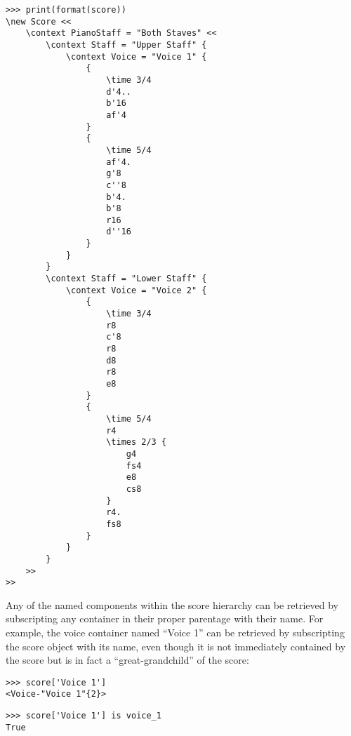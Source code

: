 \begin{abjadbookoutput}
\begin{singlespacing}
\vspace{-0.5\baselineskip}
\begin{lstlisting}
>>> print(format(score))
\new Score <<
    \context PianoStaff = "Both Staves" <<
        \context Staff = "Upper Staff" {
            \context Voice = "Voice 1" {
                {
                    \time 3/4
                    d'4..
                    b'16
                    af'4
                }
                {
                    \time 5/4
                    af'4.
                    g'8
                    c''8
                    b'4.
                    b'8
                    r16
                    d''16
                }
            }
        }
        \context Staff = "Lower Staff" {
            \context Voice = "Voice 2" {
                {
                    \time 3/4
                    r8
                    c'8
                    r8
                    d8
                    r8
                    e8
                }
                {
                    \time 5/4
                    r4
                    \times 2/3 {
                        g4
                        fs4
                        e8
                        cs8
                    }
                    r4.
                    fs8
                }
            }
        }
    >>
>>
\end{lstlisting}
\end{singlespacing}
\end{abjadbookoutput}

\noindent Any of the named components within the score hierarchy can be
retrieved by subscripting any container in their proper parentage with their
name. For example, the voice container named \enquote{Voice 1} can be retrieved
by subscripting the score object with its name, even though it is not
immediately contained by the score but is in fact a \enquote{great-grandchild}
of the score:

\begin{comment}
<abjad>
score['Voice 1']
score['Voice 1'] is voice_1
</abjad>
\end{comment}

\begin{abjadbookoutput}
\begin{singlespacing}
\vspace{-0.5\baselineskip}
\begin{lstlisting}
>>> score['Voice 1']
<Voice-"Voice 1"{2}>
\end{lstlisting}
\begin{lstlisting}
>>> score['Voice 1'] is voice_1
True
\end{lstlisting}
\end{singlespacing}
\end{abjadbookoutput}

